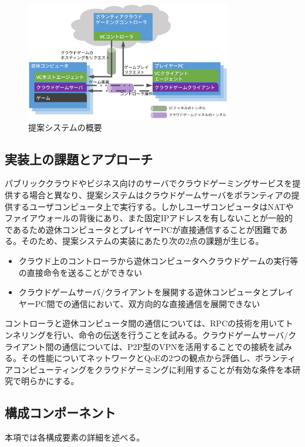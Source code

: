 \begin{figure}[t]
    \centering
    \includegraphics[width=0.8\textwidth,keepaspectratio,clip]{img/architecture.eps}
    \caption{提案システムの概要}
    \label{fig:arch}
\end{figure}

\subsection{実装上の課題とアプローチ}
パブリッククラウドやビジネス向けのサーバでクラウドゲーミングサービスを提供する場合と異なり、提案システムはクラウドゲームサーバをボランティアの提供するユーザコンピュータ上で実行する。しかしユーザコンピュータはNATやファイアウォールの背後にあり、また固定IPアドレスを有しないことが一般的であるため遊休コンピュータとプレイヤーPCが直接通信することが困難である。そのため、提案システムの実装にあたり次の2点の課題が生じる。
\begin{itemize}
    \item クラウド上のコントローラから遊休コンピュータへクラウドゲームの実行等の直接命令を送ることができない
    \item クラウドゲームサーバ/クライアントを展開する遊休コンピュータとプレイヤーPC間での通信において、双方向的な直接通信を展開できない
\end{itemize}
コントローラと遊休コンピュータ間の通信については、RPCの技術を用いてトンネリングを行い、命令の伝送を行うことを試みる。クラウドゲームサーバ/クライアント間の通信については、P2P型のVPNを活用することでの接続を試みる。その性能についてネットワークとQoEの2つの観点から評価し、ボランティアコンピューティングをクラウドゲーミングに利用することが有効な条件を本研究で明らかにする。

\subsection{構成コンポーネント}
本項では各構成要素の詳細を述べる。

